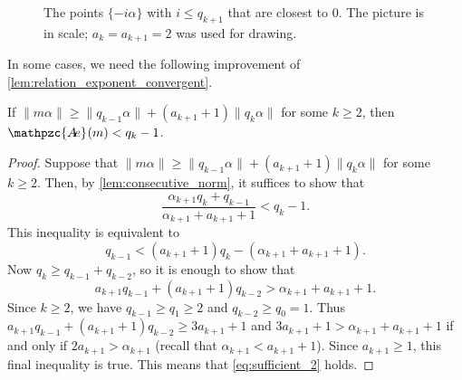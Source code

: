 \documentclass[a4paper,fleqn]{article}
\providecommand{\norm}[1]{\lVert#1\rVert}
\newcommand{\abexp}[2][]{\mathpzc{A\mkern-3mu e}_{#1}(#2)}
\begin{document}
\begin{figure}
  \caption{The points $\{-i\alpha\}$ with $i \leq q_{k+1}$ that are closest to $0$. The picture is in scale;
  $a_k = a_{k+1} = 2$ was used for drawing.}
  \label{fig:intervals}
  \end{figure}

  In some cases, we need the following improvement of \autoref{lem:relation_exponent_convergent}.

  \begin{lemma}\label{lem:relation_exponent_convergent_2}
    If $\norm{m\alpha} \geq \norm{q_{k-1}\alpha} + (a_{k+1} + 1)\norm{q_k\alpha}$ for some $k \geq 2$, then
    $\abexp{m} < q_k - 1$.
  \end{lemma}
  \begin{proof}
    Suppose that $\norm{m\alpha} \geq \norm{q_{k-1}\alpha} + (a_{k+1} + 1)\norm{q_k\alpha}$ for some $k \geq 2$. Then,
    by \autoref{lem:consecutive_norm}, it suffices to show that
    \begin{equation*}
      \frac{\alpha_{k+1}q_k + q_{k-1}}{\alpha_{k+1} + a_{k+1} + 1} < q_k - 1.
    \end{equation*}
    This inequality is equivalent to
    \begin{equation}\label{eq:foo3}
      q_{k-1} < (a_{k+1} + 1)q_k - (\alpha_{k+1} + a_{k+1} + 1).
    \end{equation}
    Now $q_k \geq q_{k-1} + q_{k-2}$, so it is enough to show that
    \begin{equation}\label{eq:sufficient_2}
      a_{k+1}q_{k-1} + (a_{k+1} + 1)q_{k-2} > \alpha_{k+1} + a_{k+1} + 1.
    \end{equation}
    Since $k \geq 2$, we have $q_{k-1} \geq q_1 \geq 2$ and $q_{k-2} \geq q_0 = 1$. Thus
    $a_{k+1}q_{k-1} + (a_{k+1} + 1)q_{k-2} \geq 3a_{k+1} + 1$ and $3a_{k+1} + 1 > \alpha_{k+1} + a_{k+1} + 1$ if and
    only if $2a_{k+1} > \alpha_{k+1}$ (recall that $\alpha_{k+1} < a_{k+1} + 1$). Since $a_{k+1} \geq 1$, this final
    inequality is true. This means that \eqref{eq:sufficient_2} holds.
  \end{proof}
\end{document}

